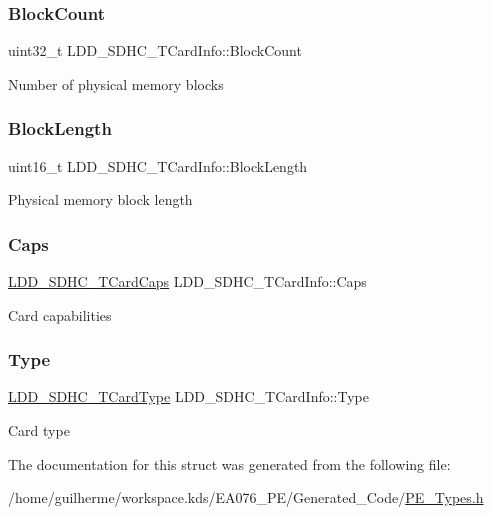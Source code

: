 \subsubsection{\texorpdfstring{Block\+Count}{BlockCount}}
{\footnotesize\ttfamily uint32\+\_\+t L\+D\+D\+\_\+\+S\+D\+H\+C\+\_\+\+T\+Card\+Info\+::\+Block\+Count}

Number of physical memory blocks \mbox{\label{struct_l_d_d___s_d_h_c___t_card_info_a46cbdea4ece83eeaa17410e9763cc3a9}} 
\subsubsection{\texorpdfstring{Block\+Length}{BlockLength}}
{\footnotesize\ttfamily uint16\+\_\+t L\+D\+D\+\_\+\+S\+D\+H\+C\+\_\+\+T\+Card\+Info\+::\+Block\+Length}

Physical memory block length \mbox{\label{struct_l_d_d___s_d_h_c___t_card_info_a591c22d1aa49944325b35c63d2bf8199}} 
\subsubsection{\texorpdfstring{Caps}{Caps}}
{\footnotesize\ttfamily \hyperlink{struct_l_d_d___s_d_h_c___t_card_caps}{L\+D\+D\+\_\+\+S\+D\+H\+C\+\_\+\+T\+Card\+Caps} L\+D\+D\+\_\+\+S\+D\+H\+C\+\_\+\+T\+Card\+Info\+::\+Caps}

Card capabilities \mbox{\label{struct_l_d_d___s_d_h_c___t_card_info_ab2b86f6fe821778459edd351d08eb4bd}} 
\subsubsection{\texorpdfstring{Type}{Type}}
{\footnotesize\ttfamily \hyperlink{group___p_e___types__module_ga5344ded013ca3da273ed4f52c9c96fc7}{L\+D\+D\+\_\+\+S\+D\+H\+C\+\_\+\+T\+Card\+Type} L\+D\+D\+\_\+\+S\+D\+H\+C\+\_\+\+T\+Card\+Info\+::\+Type}

Card type 

The documentation for this struct was generated from the following file\+:\begin{DoxyCompactItemize}
\item 
/home/guilherme/workspace.\+kds/\+E\+A076\+\_\+\+P\+E/\+Generated\+\_\+\+Code/\hyperlink{_p_e___types_8h}{P\+E\+\_\+\+Types.\+h}\end{DoxyCompactItemize}

